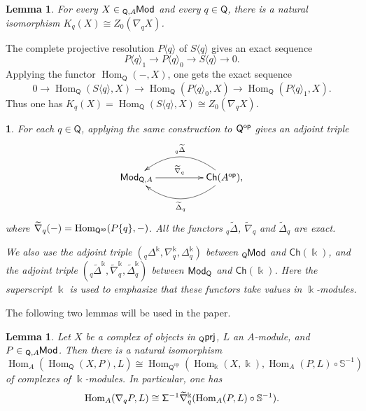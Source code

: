 \documentclass{amsart}
\theoremstyle{bfupright head,slanted body}
\theoremstyle{bfupright head,upright body}
\theoremstyle{fixed bf head,slanted body}
\newtheorem{lem}[res]{Lemma}            \newtheorem*{lem*}{Lemma}
\theoremstyle{fixed bf head,upright body}
\theoremstyle{numbered paragraph}
\newtheorem{ipg}[res]{}
\newenvironment{prf*}[1][Proof]{%
	\begin{proof}[\bf #1]
		\setcounter{equation}{0}
		\renewcommand{\theequation}{\arabic{equation}}}
	{\end{proof}
}
\numberwithin{equation}{res}
\newcommand{\ch}[1]{\mathsf{Ch}(#1)}
\newcommand{\Hom}{\operatorname{Hom}}
\newcommand{\Q}{\mathsf{Q}}
\newcommand{\Qop}{\Q^{\sf op}}
\newcommand{\kk}{\Bbbk}
\newcommand{\lMod}[1]{{}_{#1}\mspace{-1mu}{\sf{Mod}}}
\newcommand{\rMod}[1]{{\sf{Mod}}_{#1}}
\newcommand{\Aop}{A^{\mathsf{op}}}
\newcommand{\nablaq}{\nabla_q}
\newcommand{\DeltaLq}{{}_q\Delta}
\newcommand{\DeltaRq}{\Delta_q}
\begin{document}
\begin{lem}\label{lem:K-cycle}
For every $X\in\lMod{\Q,A}$ and every $q\in\Q$, there is a natural isomorphism $K_q(X)\cong Z_0(\nablaq X)$.
\end{lem}

\begin{prf*}
The complete projective resolution $P\langle q\rangle$ of $S\langle q\rangle$ gives an exact sequence
$$P\langle q\rangle_1\to
P\langle q\rangle_0\to
S\langle q\rangle\to 0.$$
Applying the functor $\Hom_{\Q}(-,X)$, one gets the exact sequence
$$0\to\Hom_{\Q}(S\langle q\rangle,X)
\to\Hom_{\Q}(P\langle q\rangle_0,X)
\to\Hom_{\Q}(P\langle q\rangle_1,X).$$
Thus one has $K_q(X)=\Hom_{\Q}(S\langle q\rangle,X)\cong Z_0(\nablaq X)$.
\end{prf*}

\begin{ipg}\label{right-adjoint}
For each $q\in\Q$, applying the same construction to $\Qop$ gives an adjoint triple
  \begin{equation*}
  \xymatrix@C=4pc{
    \rMod{\Q,A}
    \ar[r]^-{\widetilde{\nabla}_q}
    &
    \ch\Aop,
    \ar@/_1.8pc/[l]_-{{}_q\widetilde{\Delta}}
    \ar@/^1.8pc/[l]^-{\widetilde{\Delta}_q}
  }
  \end{equation*}
where $\widetilde{\nabla}_q(-)=\Hom_{\Qop}(P\{q\},-)$. All the functors ${}_q\widetilde{\Delta}$, $\widetilde{\nabla}_q$ and $\widetilde{\Delta}_q$ are exact.

We also use the adjoint triple $(\DeltaLq^{\kk}, \nablaq^{\kk}, \DeltaRq^{\kk})$ between $\lMod{\Q}$ and $\ch\kk$, and the adjoint triple $({}_q\widetilde{\Delta}^{\kk}, \widetilde{\nabla}_q^{\kk}, \widetilde{\Delta}_q^{\kk})$ between $\rMod{\Q}$ and $\ch\kk$. Here the superscript $\kk$ is used to emphasize that these functors take values in $\kk$-modules.
\end{ipg}

The following two lemmas will be used in the paper.

\begin{lem}\label{lem:serre-hom-comparison}
Let $X$ be a complex of objects in ${}_\Q\sf prj$, $L$ an $A$-module, and $P\in\lMod{\Q,A}$. Then there is a natural isomorphism
$$\Hom_A(\Hom_{\Q}(X,P),L)\cong
\Hom_{\Q^{\mathrm{op}}}(\Hom_{\kk}(X,\kk),
\Hom_A(P,L)\circ\mathbb S^{-1})$$
of complexes of $\kk$-modules. In particular, one has
$$\Hom_A(\nabla_qP,L)\cong{\sf\Sigma}^{-1}\widetilde{\nabla}_q^{\kk}
(\Hom_A(P,L)\circ\mathbb S^{-1}).$$
\end{lem}
\end{document}
